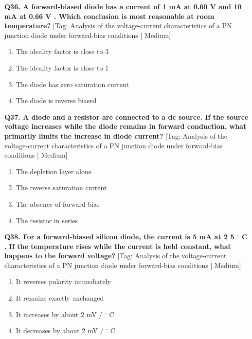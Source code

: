 \noindent\textbf{Q36. A forward-biased diode has a current of 1 mA at 0.60 V and 10 mA at 0.66 V . Which conclusion is most reasonable at room temperature?} \hfill [Tag: Analysis of the voltage-current characteristics of a PN junction diode under forward-bias conditions | Medium]
\begin{enumerate}[label=(\alph*),topsep=2pt,itemsep=1pt,partopsep=0pt,parsep=0pt]
    \item {The ideality factor is close to 3}
    \item {The ideality factor is close to 1}
    \item {The diode has zero saturation current}
    \item {The diode is reverse biased}
\end{enumerate}
\vspace{2mm}

\noindent\textbf{Q37. A diode and a resistor are connected to a dc source. If the source voltage increases while the diode remains in forward conduction, what primarily limits the increase in diode current?} \hfill [Tag: Analysis of the voltage-current characteristics of a PN junction diode under forward-bias conditions | Medium]
\begin{enumerate}[label=(\alph*),topsep=2pt,itemsep=1pt,partopsep=0pt,parsep=0pt]
    \item {The depletion layer alone}
    \item {The reverse saturation current}
    \item {The absence of forward bias}
    \item {The resistor in series}
\end{enumerate}
\vspace{2mm}

\noindent\textbf{Q38. For a forward-biased silicon diode, the current is 5 mA at 2 5 $^\circ$ C . If the temperature rises while the current is held constant, what happens to the forward voltage?} \hfill [Tag: Analysis of the voltage-current characteristics of a PN junction diode under forward-bias conditions | Medium]
\begin{enumerate}[label=(\alph*),topsep=2pt,itemsep=1pt,partopsep=0pt,parsep=0pt]
    \item {It reverses polarity immediately}
    \item {It remains exactly unchanged}
    \item {It increases by about 2 mV / $^\circ$ C}
    \item {It decreases by about 2 mV / $^\circ$ C}
\end{enumerate}
\vspace{2mm}

